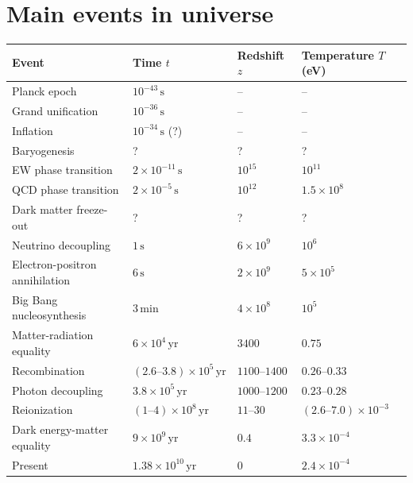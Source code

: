 \section{Main events in universe}
\begin{center}
\begin{tabular}{llll}
\toprule
\textbf{Event} & \textbf{Time $t$} & \textbf{Redshift $z$} & \textbf{Temperature $T$ (eV)} \\
\midrule
Planck epoch & $10^{-43}\,\mathrm{s}$ & -- & -- \\
Grand unification & $10^{-36}\,\mathrm{s}$ & -- & -- \\
Inflation & $10^{-34}\,\mathrm{s}$ (?) & -- & -- \\
Baryogenesis & ? & ? & ? \\
EW phase transition & $2\times10^{-11}\,\mathrm{s}$ & $10^{15}$ & $10^{11}$ \\
QCD phase transition & $2\times10^{-5}\,\mathrm{s}$ & $10^{12}$ & $1.5\times10^{8}$ \\
Dark matter freeze-out & ? & ? & ? \\
Neutrino decoupling & $1\,\mathrm{s}$ & $6\times10^{9}$ & $10^{6}$ \\
Electron-positron annihilation & $6\,\mathrm{s}$ & $2\times10^{9}$ & $5\times10^{5}$ \\
Big Bang nucleosynthesis & $3\,\mathrm{min}$ & $4\times10^{8}$ & $10^{5}$ \\
Matter-radiation equality & $6\times10^{4}\,\mathrm{yr}$ & $3400$ & $0.75$ \\
Recombination & $(2.6\text{--}3.8)\times10^{5}\,\mathrm{yr}$ & $1100\text{--}1400$ & $0.26\text{--}0.33$ \\
Photon decoupling & $3.8\times10^{5}\,\mathrm{yr}$ & $1000\text{--}1200$ & $0.23\text{--}0.28$ \\
Reionization & $(1\text{--}4)\times10^{8}\,\mathrm{yr}$ & $11\text{--}30$ & $(2.6\text{--}7.0)\times10^{-3}$ \\
Dark energy-matter equality & $9\times10^{9}\,\mathrm{yr}$ & $0.4$ & $3.3\times10^{-4}$ \\
Present & $1.38\times10^{10}\,\mathrm{yr}$ & $0$ & $2.4\times10^{-4}$ \\
\bottomrule
\end{tabular}
\end{center}

\clearpage
